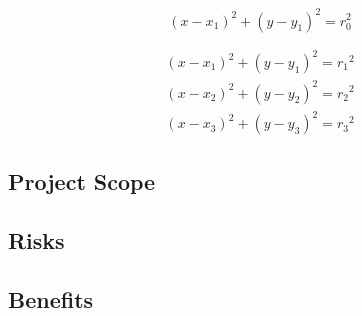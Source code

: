 \medskip
\begin{equation}
	(x-x_{1})^2 + (y-y_{1})^2 = r_{0}^2
\end{equation}

\begin{gather}
	(x-x_1)^2 + (y-y_1)^2 = {r_1}^2 \\
	\nonumber (x-x_2)^2 + (y-y_2)^2 = {r_2}^2 \\
	\nonumber (x-x_3)^2 + (y-y_3)^2 = {r_3}^2  
\end{gather}


\pagebreak
\subsection{Project Scope}









\pagebreak
\subsection{Risks}






\pagebreak
\subsection{Benefits}
\medskip


